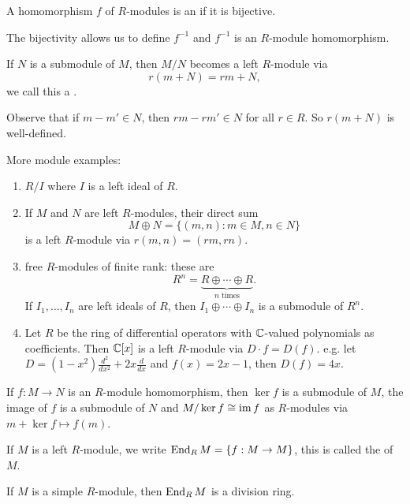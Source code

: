   \begin{define}
    A homomorphism $f$ of $R$-modules is an  if it is
    bijective.
  \end{define}
  The bijectivity allows us to define $f^{-1}$ and $f^{-1}$ is an $R$-module
  homomorphism.

  \begin{define}
    If $N$ is a submodule of $M$, then $M/N$ becomes a left $R$-module via
    \[ r(m + N) = rm + N, \]
    we call this a .
  \end{define}
  Observe that if $m-m'\in N$, then $rm - rm'\in N$ for all $r\in R$. So
  $r(m+N)$ is well-defined.

  More module examples:
  \begin{enumerate}
    \item $R/I$ where $I$ is a left ideal of $R$.
    \item If $M$ and $N$ are left $R$-modules, their direct sum
      \[ M\oplus N = \{(m,n): m \in M, n\in N\} \]
      is a left $R$-module via $r(m,n) = (rm,rn)$.
    \item free $R$-modules of finite rank: these are
      \[ R^n = \underbrace{R \oplus \cdots \oplus R}_{n\text{ times}}. \]
      If $I_1,\ldots,I_n$ are left ideals of $R$, then
      $I_1\oplus \cdots \oplus I_n$ is a submodule of $R^n$.
    \item Let $R$ be the ring of differential operators with $\mathbb{C}$-valued
      polynomials as coefficients. Then $\mathbb{C}[x]$ is a left $R$-module via
      $D \cdot f = D(f)$. e.g. let $D=(1-x^2)\frac{d^2}{dx^2}+2x\frac{d}{dx}$
      and $f(x) = 2x-1$, then $D(f) = 4x$.
  \end{enumerate}

  \begin{lemma}
    If $f:M\to N$ is an $R$-module homomorphism, then $\ker f$ is a submodule
    of $M$, the image of $f$ is a submodule of $N$ and $M/\ker f \cong \operatorname{im} f$
    as $R$-modules via $m+\ker f \mapsto f(m)$.
  \end{lemma}

  \begin{define}
    If $M$ is a left $R$-module, we write $\operatorname{End}_R{M} = \{f:M\to M\}$, this is
    called the  of $M$.
  \end{define}

  \begin{lemma}
    If $M$ is a simple $R$-module, then $\operatorname{End}_R{M}$ is a division ring.
  \end{lemma}

